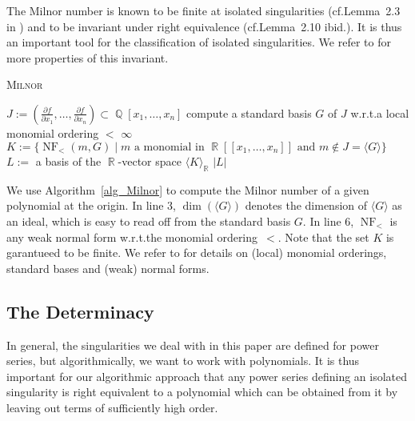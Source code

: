 \documentclass[noend]{amsproc}
\DeclareMathOperator{\NF}{NF}
\DeclareMathOperator{\Q}{\mathbb{Q}}
\DeclareMathOperator{\R}{\mathbb{R}}
\begin{document}
The Milnor number is known to be finite at isolated singularities
(cf.\@ Lemma~2.3 in \cite{GLS2007}) and to be invariant under right equivalence
(cf.\@ Lemma~2.10 ibid.). It is thus an important tool for the classification
of isolated singularities. We refer to \cite{GLS2007} for more properties of
this invariant.

\begin{algorithm}[h]
\caption{\label{alg_Milnor} \textsc{Milnor}}
\begin{algorithmic}[1]

\REQUIRE{$f \in \Q[x_1,\ldots,x_n]$}

\STATE $J := \left( \frac{\partial f}{\partial x_1}, \ldots,
\frac{\partial f}{\partial x_n} \right) \subset \Q[x_1,\ldots,x_n]$
\STATE compute a standard basis $G$ of $J$ w.r.t.\@ a local monomial ordering
$<$
\RETURN $\infty$
\ELSE
\STATE $K := \{\NF_<(m, G) \mid m \text{ a monomial in } \R[[x_1,\ldots,x_n]]
\text{ and } m \not\in J = \langle G \rangle \}$
\STATE $L :=$ a basis of the $\R$-vector space $\langle K \rangle_{\R}$
\RETURN $|L|$
\ENDIF

\end{algorithmic}
\end{algorithm}

We use Algorithm~\ref{alg_Milnor} to compute the Milnor number of a given
polynomial at the origin. In line 3, $\dim(\langle G \rangle)$ denotes the
dimension of $\langle G \rangle$ as an ideal, which is easy to read off from
the standard basis $G$. In line 6, $\NF_<$ is any weak normal form w.r.t.\@ the
monomial ordering~$<$. Note that the set $K$ is garantueed to be finite. We
refer to \cite{GP2008} for details on (local) monomial orderings, standard
bases and (weak) normal forms.


\subsection{The Determinacy}%
\label{subsec:determinacy}

In general, the singularities we deal with in this paper are defined for power
series, but algorithmically, we want to work with polynomials. It is thus
important for our algorithmic approach that any power series defining an
isolated singularity is right equivalent to a polynomial which can be obtained
from it by leaving out terms of sufficiently high order.
\end{document}
